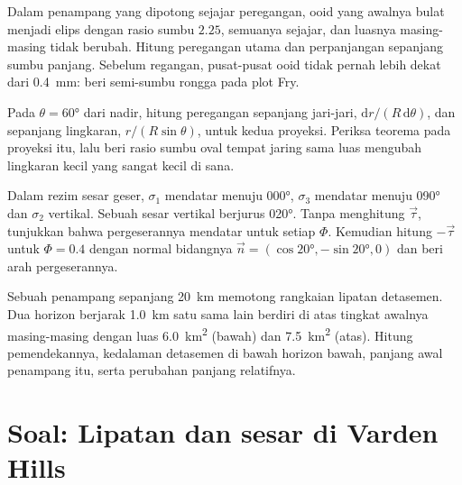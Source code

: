 \begin{exercise}[$\star\star$]\label{exo:b3:structural-analysis:9}
Dalam penampang yang dipotong sejajar peregangan, ooid yang awalnya bulat menjadi elips
dengan rasio sumbu $2.25$, semuanya sejajar, dan luasnya masing-masing
tidak berubah. Hitung peregangan utama dan perpanjangan sepanjang sumbu panjang. Sebelum regangan,
pusat-pusat ooid tidak pernah lebih dekat dari
\qty{0.4}{mm}: beri semi-sumbu rongga pada plot Fry.
\end{exercise}

\begin{exercise}[$\star\star\star$]\label{exo:b3:structural-analysis:10}
Pada $\theta = \ang{60}$ dari nadir, hitung peregangan sepanjang jari-jari,
$\mathrm dr/(R\,\mathrm d\theta)$, dan sepanjang lingkaran, $r/(R\sin\theta)$,
untuk kedua proyeksi. Periksa teorema pada proyeksi itu, lalu beri rasio sumbu oval
tempat jaring sama luas mengubah lingkaran kecil yang sangat kecil
di sana.
\end{exercise}

\begin{exercise}[$\star\star\star$]\label{exo:b3:structural-analysis:11}
Dalam rezim sesar geser, $\sigma_1$ mendatar menuju \ang{000},
$\sigma_3$ mendatar menuju \ang{090} dan $\sigma_2$ vertikal. Sebuah sesar vertikal
berjurus \ang{020}. Tanpa menghitung $\vec\tau$, tunjukkan bahwa pergeserannya
mendatar untuk setiap $\Phi$. Kemudian hitung $-\vec\tau$ untuk $\Phi = 0.4$ dengan
normal bidangnya $\vec n = (\cos\ang{20}, -\sin\ang{20}, 0)$ dan beri
arah pergeserannya.
\end{exercise}

\begin{exercise}[$\star\star\star$]\label{exo:b3:structural-analysis:12}
Sebuah penampang sepanjang \qty{20}{km} memotong rangkaian lipatan detasemen. Dua horizon
berjarak \qty{1.0}{km} satu sama lain berdiri di atas tingkat awalnya masing-masing dengan luas
\qty{6.0}{km^2} (bawah) dan \qty{7.5}{km^2} (atas). Hitung pemendekannya,
kedalaman detasemen di bawah horizon bawah, panjang awal penampang itu,
serta perubahan panjang relatifnya.
\end{exercise}

\section{Soal: Lipatan dan sesar di Varden Hills}

